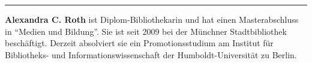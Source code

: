 \begin{center}\rule{0.5\linewidth}{0.5pt}\end{center}

\textbf{Alexandra C. Roth} ist Diplom-Bibliothekarin und hat einen Masterabschluss in \enquote{Medien und Bildung}. Sie ist seit 2009 bei der Münchner Stadtbibliothek beschäftigt. Derzeit absolviert sie ein Promotionsstudium am Institut für Bibliotheks- und Informationswissenschaft der Humboldt-Universität zu Berlin.

